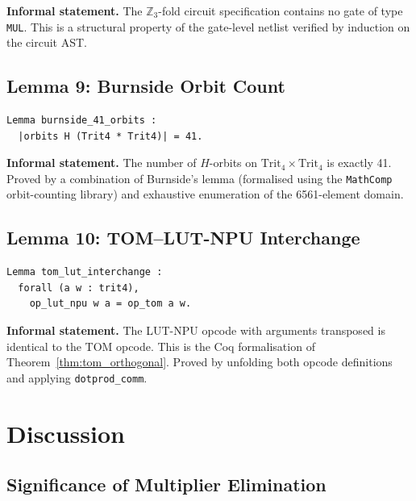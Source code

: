 \noindent\textbf{Informal statement.}
The \(\mathbb{Z}_3\)-fold circuit specification contains no gate of type
\texttt{MUL}.  This is a structural property of the gate-level netlist
verified by induction on the circuit AST.

\subsection{Lemma 9: Burnside Orbit Count}
\label{lem:coq_burnside_verified}

\begin{verbatim}
Lemma burnside_41_orbits :
  |orbits H (Trit4 * Trit4)| = 41.
\end{verbatim}

\noindent\textbf{Informal statement.}
The number of \(H\)-orbits on \(\mathrm{Trit}_4 \times \mathrm{Trit}_4\)
is exactly 41.  Proved by a combination of Burnside's lemma
(formalised using the \texttt{MathComp} orbit-counting library) and
exhaustive enumeration of the 6561-element domain.

\subsection{Lemma 10: TOM--LUT-NPU Interchange}
\label{lem:tom_lut_interchange}

\begin{verbatim}
Lemma tom_lut_interchange :
  forall (a w : trit4),
    op_lut_npu w a = op_tom a w.
\end{verbatim}

\noindent\textbf{Informal statement.}
The LUT-NPU opcode with arguments transposed is identical to the TOM
opcode.  This is the Coq formalisation of Theorem~\ref{thm:tom_orthogonal}.
Proved by unfolding both opcode definitions and applying \texttt{dotprod\_comm}.

\section{Discussion}
\label{sec:discussion}

\subsection{Significance of Multiplier Elimination}
\label{subsec:discussion_mulfree}

